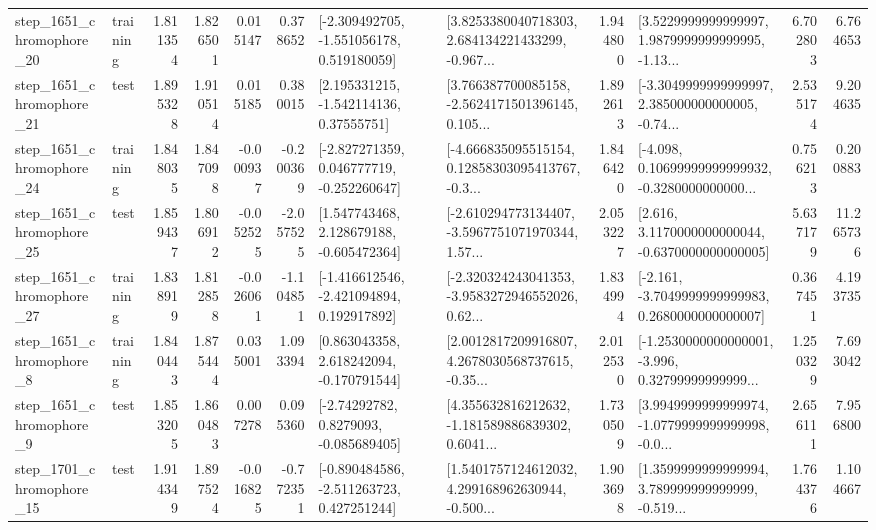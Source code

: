 \begin{tabular}{llrrrrllrlrr}
 step\_1651\_chromophore\_20 &  training &      1.811354 &    1.826501 &      0.015147 &  0.378652 &   [-2.309492705, -1.551056178, 0.519180059] &  [3.8253380040718303, 2.684134221433299, -0.967... &       1.944800 &  [3.5229999999999997, 1.9879999999999995, -1.13... &            6.702803 &          6.764653 \\
 step\_1651\_chromophore\_21 &      test &      1.895328 &    1.910514 &      0.015185 &  0.380015 &     [2.195331215, -1.542114136, 0.37555751] &  [3.766387700085158, -2.5624171501396145, 0.105... &       1.892613 &  [-3.3049999999999997, 2.385000000000005, -0.74... &            2.535174 &          9.204635 \\
 step\_1651\_chromophore\_24 &  training &      1.848035 &    1.847098 &     -0.000937 & -0.200369 &   [-2.827271359, 0.046777719, -0.252260647] &  [-4.666835095515154, 0.12858303095413767, -0.3... &       1.846420 &  [-4.098, 0.10699999999999932, -0.3280000000000... &            0.756213 &          0.200883 \\
 step\_1651\_chromophore\_25 &      test &      1.859437 &    1.806912 &     -0.052525 & -2.057525 &    [1.547743468, 2.128679188, -0.605472364] &  [-2.610294773134407, -3.5967751071970344, 1.57... &       2.053227 &   [2.616, 3.1170000000000044, -0.6370000000000005] &            5.637179 &         11.265736 \\
 step\_1651\_chromophore\_27 &  training &      1.838919 &    1.812858 &     -0.026061 & -1.104851 &   [-1.416612546, -2.421094894, 0.192917892] &  [-2.320324243041353, -3.9583272946552026, 0.62... &       1.834994 &  [-2.161, -3.7049999999999983, 0.2680000000000007] &            0.367451 &          4.193735 \\
  step\_1651\_chromophore\_8 &  training &      1.840443 &    1.875444 &      0.035001 &  1.093394 &    [0.863043358, 2.618242094, -0.170791544] &  [2.0012817209916807, 4.2678030568737615, -0.35... &       2.012530 &  [-1.2530000000000001, -3.996, 0.32799999999999... &            1.250329 &          7.693042 \\
  step\_1651\_chromophore\_9 &      test &      1.853205 &    1.860483 &      0.007278 &  0.095360 &      [-2.74292782, 0.8279093, -0.085689405] &  [4.355632816212632, -1.181589886839302, 0.6041... &       1.730509 &  [3.9949999999999974, -1.0779999999999998, -0.0... &            2.656111 &          7.956800 \\
 step\_1701\_chromophore\_15 &      test &      1.914349 &    1.897524 &     -0.016825 & -0.772351 &   [-0.890484586, -2.511263723, 0.427251244] &  [1.5401757124612032, 4.299168962630944, -0.500... &       1.903698 &  [1.3599999999999994, 3.789999999999999, -0.519... &            1.764376 &          1.104667 \\

\end{tabular}
